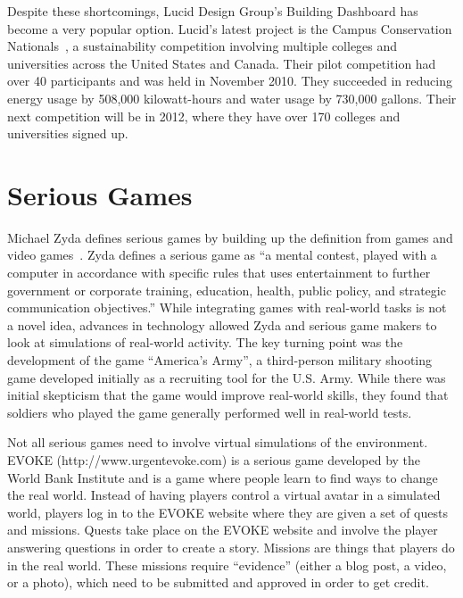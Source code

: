 Despite these shortcomings, Lucid Design Group's Building Dashboard has become a very popular option. Lucid's latest project is the Campus Conservation Nationals~\cite{lucid-ccn}, a sustainability competition involving multiple colleges and universities across the United States and Canada. Their pilot competition had over 40 participants and was held in November 2010. They succeeded in reducing energy usage by 508,000 kilowatt-hours and water usage by 730,000 gallons. Their next competition will be in 2012, where they have over 170 colleges and universities signed up.

\section{Serious Games}
\label{related:serious-games}

Michael Zyda defines serious games by building up the definition from games and video games~\cite{zyda-from-visual-sim}.  Zyda defines a serious game as ``a mental contest, played with a computer in accordance with specific rules that uses entertainment to further government or corporate training, education, health, public policy, and strategic communication objectives.''  While integrating games with real-world tasks is not a novel idea, advances in technology allowed Zyda and serious game makers to look at simulations of real-world activity.  The key turning point was the development of the game ``America's Army'', a third-person military shooting game developed initially as a recruiting tool for the U.S. Army.  While there was initial skepticism that the game would improve real-world skills, they found that soldiers who played the game generally performed well in real-world tests.

Not all serious games need to involve virtual simulations of the environment.  EVOKE (http://www.urgentevoke.com) is a serious game developed by the World Bank Institute and is a game where people learn to find ways to change the real world.  Instead of having players control a virtual avatar in a simulated world, players log in to the EVOKE website where they are given a set of quests and missions.  Quests take place on the EVOKE website and involve the player answering questions in order to create a story.  Missions are things that players do in the real world.  These missions require ``evidence'' (either a blog post, a video, or a photo), which need to be submitted and approved in order to get credit.

